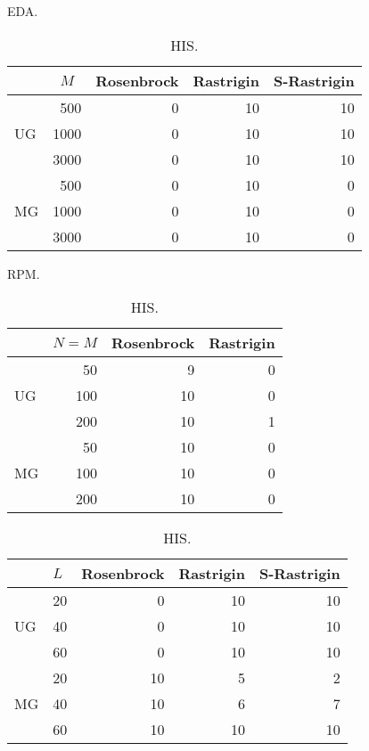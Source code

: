 
\begin{table}[tbp]
\centering
\caption{\aexpcontinuous EDA.}
\begin{tabular}{|l|r|r|r|r|}
\hline
 & \multicolumn{1}{c|}{$M$} & \multicolumn{1}{l|}{Rosenbrock} & \multicolumn{1}{l|}{Rastrigin} & \multicolumn{1}{l|}{S-Rastrigin} \\ \hline
 & 500 & 0 & 10 & 10 \\ \cline{2-5}
UG & 1000 & 0 & 10 & 10 \\ \cline{ 2- 5}
 & 3000 & 0 & 10 & 10 \\ \hline
 & 500 & 0 & 10 & 0 \\ \cline{ 2- 5}
MG & 1000 & 0 & 10 & 0 \\ \cline{ 2- 5}
 & 3000 & 0 & 10 & 0 \\ \hline
\end{tabular}
\label{aexp-cont-best-eda}


\centering
\caption{\aexpcontinuous RPM.}
\begin{tabular}{|l|r|r|r|}
\hline
 & \multicolumn{1}{l|}{$N=M$} & \multicolumn{1}{l|}{Rosenbrock} & \multicolumn{1}{l|}{Rastrigin} \\ \hline
 & 50 & 9 & 0 \\ \cline{ 2- 4}
UG & 100 & 10 & 0 \\ \cline{ 2- 4}
 & 200 & 10 & 1 \\ \hline
 & 50 & 10 & 0 \\ \cline{ 2- 4}
MG & 100 & 10 & 0 \\ \cline{ 2- 4}
 & 200 & 10 & 0 \\ \hline
\end{tabular}
\label{aexp-cont-best-rpm}

\centering
\caption{\aexpcontinuous HIS.}
\begin{tabular}{|l|r|r|r|r|}
\hline
 & \multicolumn{1}{l|}{$L$} & \multicolumn{1}{l|}{Rosenbrock} & \multicolumn{1}{l|}{Rastrigin} & \multicolumn{1}{l|}{S-Rastrigin} \\ \hline
 & 20 & 0 & 10 & 10 \\ \cline{2-5}
UG & 40 & 0 & 10 & 10 \\ \cline{ 2- 5}
 &  60 & 0 & 10 & 10 \\ \hline
 &  20& 10 & 5 & 2 \\ \cline{ 2- 5}
MG & 40 & 10 & 6 & 7 \\ \cline{ 2- 5}
 & 60 & 10 & 10 & 10 \\ \hline
\end{tabular}
\label{aexp-cont-best-his}
\end{table}

